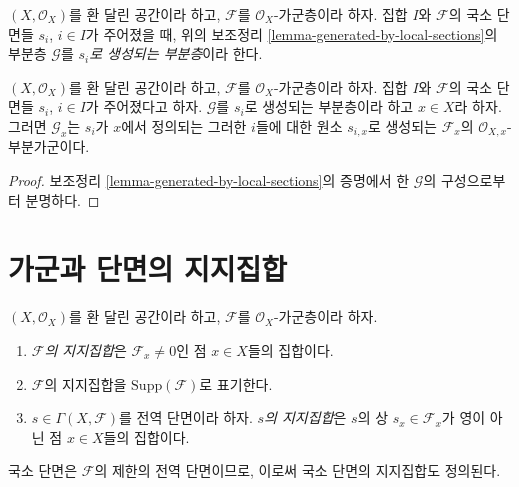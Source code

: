 \begin{definition}
\label{definition-generated-by-local-sections}
$(X, \mathcal{O}_X)$를 환 달린 공간이라 하고, $\mathcal{F}$를
$\mathcal{O}_X$-가군층이라 하자. 집합 $I$와 $\mathcal{F}$의 국소 단면들
$s_i$, $i \in I$가 주어졌을 때, 위의 보조정리
\ref{lemma-generated-by-local-sections}의 부분층 $\mathcal{G}$를
{\it $s_i$로 생성되는 부분층}이라 한다.
\end{definition}

\begin{lemma}
\label{lemma-generated-by-local-sections-stalk}
$(X, \mathcal{O}_X)$를 환 달린 공간이라 하고, $\mathcal{F}$를
$\mathcal{O}_X$-가군층이라 하자. 집합 $I$와 $\mathcal{F}$의 국소 단면들
$s_i$, $i \in I$가 주어졌다고 하자. $\mathcal{G}$를 $s_i$로 생성되는 부분층이라
하고 $x\in X$라 하자. 그러면 $\mathcal{G}_x$는 $s_i$가 $x$에서 정의되는
그러한 $i$들에 대한 원소 $s_{i, x}$로 생성되는 $\mathcal{F}_x$의
$\mathcal{O}_{X, x}$-부분가군이다.
\end{lemma}

\begin{proof}
보조정리 \ref{lemma-generated-by-local-sections}의 증명에서 한
$\mathcal{G}$의 구성으로부터 분명하다.
\end{proof}










\section{가군과 단면의 지지집합}
\label{section-support}

\begin{definition}
\label{definition-support}
$(X, \mathcal{O}_X)$를 환 달린 공간이라 하고, $\mathcal{F}$를
$\mathcal{O}_X$-가군층이라 하자.
\begin{enumerate}
\item {\it $\mathcal{F}$의 지지집합}은 $\mathcal{F}_x \not = 0$인
점 $x \in X$들의 집합이다.
\item $\mathcal{F}$의 지지집합을 $\text{Supp}(\mathcal{F})$로 표기한다.
\item $s \in \Gamma(X, \mathcal{F})$를 전역 단면이라 하자. {\it $s$의 지지집합}은
$s$의 상 $s_x \in \mathcal{F}_x$가 영이 아닌 점 $x \in X$들의 집합이다.
\end{enumerate}
\end{definition}

\noindent
국소 단면은 $\mathcal{F}$의 제한의 전역 단면이므로, 이로써 국소 단면의
지지집합도 정의된다.

